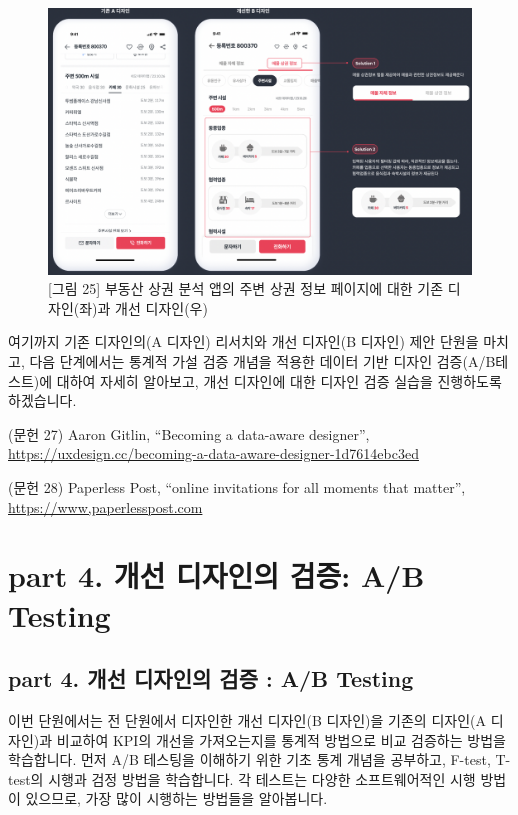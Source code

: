 \documentclass[
  letterpaper,
]{book}
\begin{document}
\begin{figure}[H]

{\centering \includegraphics{img/fig25.png}

}

\caption{{[}그림 25{]} 부동산 상권 분석 앱의 주변 상권 정보 페이지에
대한 기존 디자인(좌)과 개선 디자인(우)}

\end{figure}%

여기까지 기존 디자인의(A 디자인) 리서치와 개선 디자인(B 디자인) 제안
단원을 마치고, 다음 단계에서는 통계적 가설 검증 개념을 적용한 데이터
기반 디자인 검증(A/B테스트)에 대하여 자세히 알아보고, 개선 디자인에 대한
디자인 검증 실습을 진행하도록 하겠습니다.

(문헌 27) Aaron Gitlin, ``Becoming a data-aware designer'',
\url{https://uxdesign.cc/becoming-a-data-aware-designer-1d7614ebc3ed}

(문헌 28) Paperless Post, ``online invitations for all moments that
matter'', \url{https://www,paperlesspost.com}

\part{\textbf{part 4. 개선 디자인의 검증: A/B Testing}}

\chapter{part 4. 개선 디자인의 검증 : A/B
Testing}\label{part-4.-uxac1cuxc120-uxb514uxc790uxc778uxc758-uxac80uxc99d-ab-testing-1}

이번 단원에서는 전 단원에서 디자인한 개선 디자인(B 디자인)을 기존의
디자인(A 디자인)과 비교하여 KPI의 개선을 가져오는지를 통계적 방법으로
비교 검증하는 방법을 학습합니다. 먼저 A/B 테스팅을 이해하기 위한 기초
통계 개념을 공부하고, F-test, T-test의 시행과 검정 방법을 학습합니다. 각
테스트는 다양한 소프트웨어적인 시행 방법이 있으므로, 가장 많이 시행하는
방법들을 알아봅니다.
\end{document}

